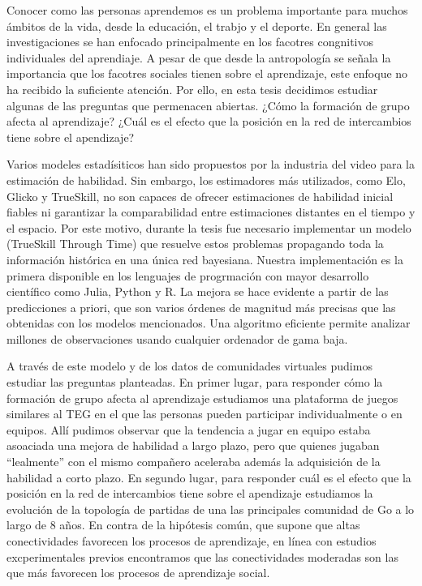 \documentclass[a4paper,10pt]{book}
\theoremstyle{definition}
\begin{document}

Conocer como las personas aprendemos es un problema importante para muchos ámbitos de la vida, desde la educación, el trabjo y el deporte.
%
En general las investigaciones se han enfocado principalmente en los facotres congnitivos individuales del aprendiaje.
%
A pesar de que desde la antropología se señala la importancia que los facotres sociales tienen sobre el aprendizaje, este enfoque no ha recibido la suficiente atención.
%
Por ello, en esta tesis decidimos estudiar algunas de las preguntas que permenacen abiertas.
%
¿Cómo la formación de grupo afecta al aprendizaje?
%
¿Cuál es el efecto que la posición en la red de intercambios tiene sobre el apendizaje?


Varios modeles estadísiticos han sido propuestos por la industria del video para la estimación de habilidad.
%
Sin embargo, los estimadores más utilizados, como Elo, Glicko y TrueSkill, no son capaces de ofrecer estimaciones de habilidad inicial fiables ni garantizar la comparabilidad entre estimaciones distantes en el tiempo y el espacio.
%
Por este motivo, durante la tesis fue necesario implementar un modelo (TrueSkill Through Time) que resuelve estos problemas propagando toda la información histórica en una única red bayesiana. 
%
Nuestra implementación es la primera disponible en los lenguajes de progrmación con mayor desarrollo científico como Julia, Python y R.
%
La mejora se hace evidente a partir de las predicciones a priori, que son varios órdenes de magnitud más precisas que las obtenidas con los modelos mencionados.
%
Una algoritmo eficiente permite analizar millones de observaciones usando cualquier ordenador de gama baja.


A través de este modelo y de los datos de comunidades virtuales pudimos estudiar las preguntas planteadas.
%
En primer lugar, para responder cómo la formación de grupo afecta al aprendizaje estudiamos una plataforma de juegos similares al TEG en el que las personas pueden participar individualmente o en equipos.
%
Allí pudimos observar que la tendencia a jugar en equipo estaba asoaciada una mejora de habilidad a largo plazo, pero que quienes jugaban ``lealmente'' con el mismo compañero aceleraba además la adquisición de la habilidad a corto plazo.
%
En segundo lugar, para responder cuál es el efecto que la posición en la red de intercambios tiene sobre el apendizaje estudiamos la evolución de la topología de partidas de una las principales comunidad de Go a lo largo de 8 años.
%
En contra de la hipótesis común, que supone que altas conectividades favorecen los procesos de aprendizaje, en línea con estudios excperimentales previos encontramos que las conectividades moderadas son las que más favorecen los procesos de aprendizaje social.
\end{document}

